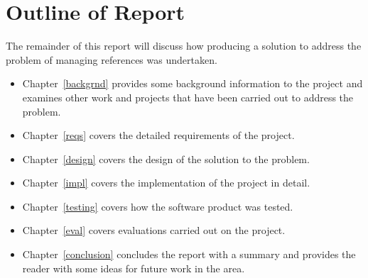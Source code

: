 
\section{Outline of Report}
The remainder of this report will discuss how producing a solution to address the problem of managing \bibtex{} references was undertaken. 
\begin{itemize}
\item Chapter~\ref{backgrnd} provides some background information to the project and examines other work and projects that have been carried out to address the problem.
\item Chapter~\ref{reqs} covers the detailed requirements of the project.
\item Chapter~\ref{design} covers the design of the solution to the problem.
\item Chapter~\ref{impl} covers the implementation of the project in detail.
\item Chapter~\ref{testing} covers how the software product was tested.
\item Chapter~\ref{eval} covers evaluations carried out on the project.
\item Chapter~\ref{conclusion} concludes the report with a summary and provides the reader with some ideas for future work in the area.
\end{itemize}